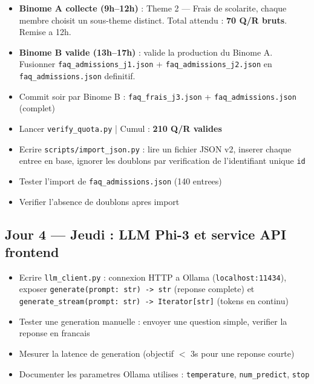 \documentclass[11pt,a4paper]{article}
\begin{document}
\begin{databox}[Data --- J3]
\begin{itemize}
    \item[$\square$] \textbf{Binome A collecte (9h--12h)} : Theme 2 --- Frais de scolarite, chaque membre choisit un sous-theme distinct. Total attendu : \textbf{70 Q/R bruts}. Remise a 12h.
    \item[$\square$] \textbf{Binome B valide (13h--17h)} : valide la production du Binome A. Fusionner \texttt{faq\_admissions\_j1.json} + \texttt{faq\_admissions\_j2.json} en \texttt{faq\_admissions.json} definitif.
    \item[$\square$] Commit soir par Binome B : \texttt{faq\_frais\_j3.json} + \texttt{faq\_admissions.json} (complet)
    \item[$\square$] Lancer \texttt{verify\_quota.py} | Cumul : \textbf{210 Q/R valides}
\end{itemize}
\end{databox}

\begin{dbbox}
\begin{itemize}
    \item[$\square$] Ecrire \texttt{scripts/import\_json.py} : lire un fichier JSON v2, inserer chaque entree en base, ignorer les doublons par verification de l'identifiant unique \texttt{id}
    \item[$\square$] Tester l'import de \texttt{faq\_admissions.json} (140 entrees)
    \item[$\square$] Verifier l'absence de doublons apres import
\end{itemize}
\end{dbbox}

\subsection{Jour 4 --- Jeudi : LLM Phi-3 et service API frontend}

\begin{ragbox}[Backend --- J4]
\begin{itemize}
    \item[$\square$] Ecrire \texttt{llm\_client.py} : connexion HTTP a Ollama (\texttt{localhost:11434}), exposer \texttt{generate(prompt: str) -> str} (reponse complete) et \texttt{generate\_stream(prompt: str) -> Iterator[str]} (tokens en continu)
    \item[$\square$] Tester une generation manuelle : envoyer une question simple, verifier la reponse en francais
    \item[$\square$] Mesurer la latence de generation (objectif $<$ 3s pour une reponse courte)
    \item[$\square$] Documenter les parametres Ollama utilises : \texttt{temperature}, \texttt{num\_predict}, \texttt{stop}
\end{itemize}
\end{ragbox}
\end{document}
